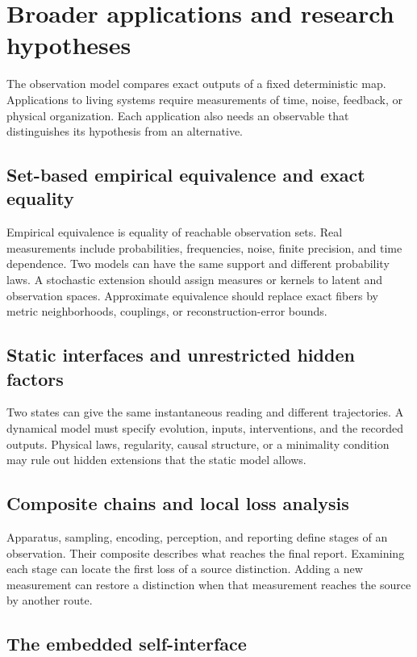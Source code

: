\section{Broader applications and research hypotheses}
\label{sec:limitations}

The observation model compares exact outputs of a fixed deterministic map. Applications to living systems require measurements of time, noise, feedback, or physical organization. Each application also needs an observable that distinguishes its hypothesis from an alternative.

\subsection{Set-based empirical equivalence and exact equality}

Empirical equivalence is equality of reachable observation sets. Real measurements include probabilities, frequencies, noise, finite precision, and time dependence. Two models can have the same support and different probability laws. A stochastic extension should assign measures or kernels to latent and observation spaces. Approximate equivalence should replace exact fibers by metric neighborhoods, couplings, or reconstruction-error bounds.

\subsection{Static interfaces and unrestricted hidden factors}

Two states can give the same instantaneous reading and different trajectories. A dynamical model must specify evolution, inputs, interventions, and the recorded outputs. Physical laws, regularity, causal structure, or a minimality condition may rule out hidden extensions that the static model allows.

\subsection{Composite chains and local loss analysis}

Apparatus, sampling, encoding, perception, and reporting define stages of an observation. Their composite describes what reaches the final report. Examining each stage can locate the first loss of a source distinction. Adding a new measurement can restore a distinction when that measurement reaches the source by another route.

\subsection{The embedded self-interface}

